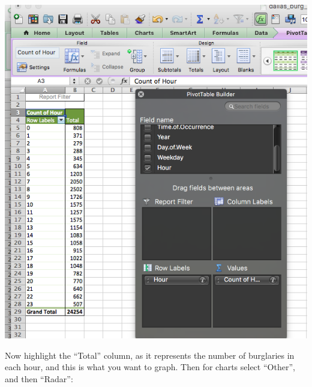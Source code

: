 \documentclass[]{book}
\theoremstyle{definition}
\theoremstyle{definition}
\theoremstyle{definition}
\theoremstyle{remark}
\begin{document}
\includegraphics{imgs/hr_freq.png}

Now highlight the ``Total'' column, as it represents the number of
burglaries in each hour, and this is what you want to graph. Then for
charts select ``Other'', and then ``Radar'':
\end{document}
